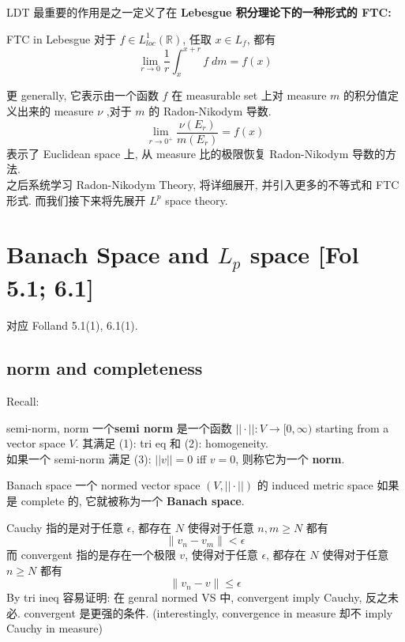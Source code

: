 \documentclass[lang=cn,11pt]{elegantbook}
\begin{document}
\begin{remark}
    
   LDT 最重要的作用是之一定义了在 \textbf{Lebesgue 积分理论下的一种形式的 FTC: }
   \begin{theorem}{FTC in Lebesgue }
对于 $f \in L^1 _{loc}(\mathbb{R})$, 任取 $x \in L_f$, 都有 \[
\lim_{r\to 0} \frac{1}{r} \int_x ^{x+r} f\; dm = f(x)
\]
\end{theorem}
更 generally, 它表示由一个函数 $f$ 在 measurable set 上对 measure $m$ 的积分值定义出来的 measure $\nu$ ,对于 $m$ 的 Radon-Nikodym 导数.
\[
\lim_{r\to 0^+} \frac{\nu(E_r)}{m(E_r)} = f(x)
\]
表示了 Euclidean space 上, 从 measure 比的极限恢复 Radon-Nikodym 导数的方法.\\
之后系统学习 Radon-Nikodym Theory, 将详细展开, 并引入更多的不等式和 FTC 形式. 而我们接下来将先展开 $L^p$ space theory.
\end{remark}






\chapter{Banach Space and $L_p$ space [Fol 5.1; 6.1]}
对应  Folland 5.1(1), 6.1(1).
\section{norm and completeness}
Recall:
\begin{definition}{semi-norm, norm}
  一个\textbf{semi norm} 是一个函数 $||\cdot||: V \to [0,\infty)$ starting from a vector space $V$. 其满足 (1): tri eq 和 (2): homogeneity.\\
   如果一个 semi-norm 满足 (3): $||v|| = 0$ iff $v = 0$, 则称它为一个 \textbf{norm}.
\end{definition}

\begin{definition}{Banach space}
一个 normed vector space $(V, ||\cdot||)$ 的 induced metric space 如果是 complete 的, 它就被称为一个 \textbf{Banach space}.\\
\end{definition}
\begin{remark}
    Cauchy 指的是对于任意 $\epsilon$, 都存在 $N$ 使得对于任意 $n,m \geq N$ 都有 \[
    \| v_n - v_m\| < \epsilon
    \]
而 convergent 指的是存在一个极限 $v$, 使得对于任意 $\epsilon$, 都存在 $N$ 使得对于任意 $n\geq N$ 都有 \[
\|v_n - v\| \leq \epsilon
\]
By tri ineq 容易证明: 在 genral normed VS 中, convergent imply Cauchy, 反之未必. convergent 是更强的条件. (interestingly, convergence in measure 却不 imply Cauchy in measure)
\end{remark}
\end{document}
